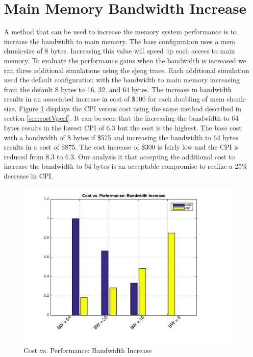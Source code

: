 \documentclass[11pt,titlepage]{article}
\begin{document}
\section{Main Memory Bandwidth Increase}
   A method that can be used to increase the memory system performance is to increase the bandwidth to main memory. The base configuration uses a mem chunk-size of 8 bytes. Increasing this value will speed up each access to main memory. To evaluate the performance gains when the bandwidth is increased we ran three additional simulations using the sjeng trace. Each additional simulation used the default configuration with the bandwidth to main memory increasing from the default 8 bytes to 16, 32, and 64 bytes. The increase in bandwidth results in an associated increase in cost of \$100 for each doubling of mem chunk-size. Figure \ref{fig:exSj} displays the CPI versus cost using the same method described in section \ref{sec:costVperf}. It can be seen that the increasing the bandwidth to 64 bytes results in the lowest CPI of 6.3 but the cost is the highest. The base cost with a bandwidth of 8 bytes if \$575 and increasing the bandwidth to 64 bytes results in a cost of \$875. The cost increase of \$300 is fairly low and the CPI is reduced from 8.3 to 6.3. Our analysis it that accepting the additional cost to increase the bandwidth to 64 bytes is an acceptable compromise to realize a 25\% decrease in CPI.
   \begin{figure}[H]
       \centering
       \includegraphics[scale=0.75]{extraSjeng}
       \caption{Cost vs. Performance: Bandwidth Increase}
       \label{fig:exSj}
   \end{figure}
\end{document}
